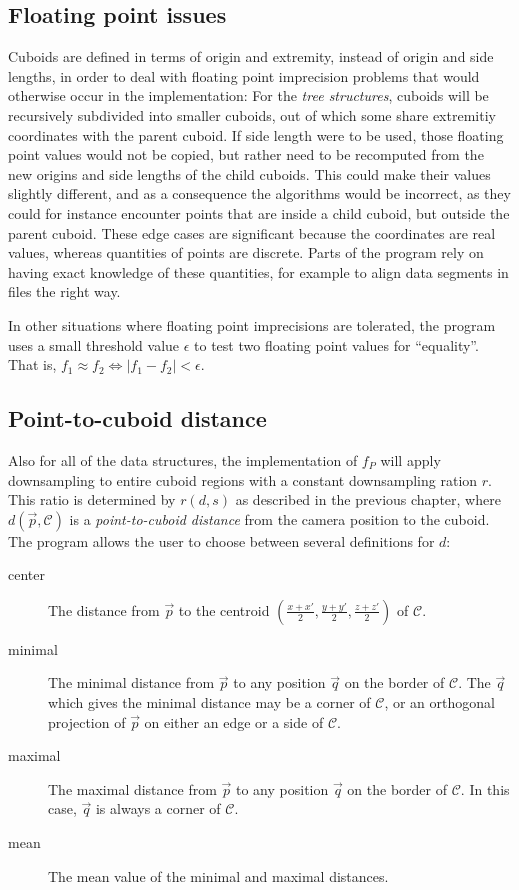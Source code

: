 \documentclass[a4paper,10pt,abstracton,notitlepage]{scrreprt}
\begin{document}
\subsection{Floating point issues}
Cuboids are defined in terms of origin and extremity, instead of origin and side lengths, in order to deal with floating point imprecision problems that would otherwise occur in the implementation: For the \emph{tree structures}, cuboids will be recursively subdivided into smaller cuboids, out of which some share extremitiy coordinates with the parent cuboid. If side length were to be used, those floating point values would not be copied, but rather need to be recomputed from the new origins and side lengths of the child cuboids. This could make their values slightly different, and as a consequence the algorithms would be incorrect, as they could for instance encounter points that are inside a child cuboid, but outside the parent cuboid.
These edge cases are significant because the coordinates are real values, whereas quantities of points are discrete. Parts of the program rely on having exact knowledge of these quantities, for example to align data segments in files the right way.

In other situations where floating point imprecisions are tolerated, the program uses a small threshold value $\epsilon$ to test two floating point values for ``equality''. That is, $f_{1} \approx f_{2} \Longleftrightarrow |f_{1} - f_{2}| < \epsilon$.

\subsection{Point-to-cuboid distance}
Also for all of the data structures, the implementation of $f_{P}$ will apply downsampling to entire cuboid regions with a constant downsampling ration $r$. This ratio is determined by $r(d, s)$ as described in the previous chapter, where $d(\overrightarrow{p}, \mathcal{C})$ is a \emph{point-to-cuboid distance} from the camera position to the cuboid. The program allows the user to choose between several definitions for $d$:
\begin{description}
\item[center] The distance from $\overrightarrow{p}$ to the centroid $( \frac{x + x'}{2}, \frac{y + y'}{2}, \frac{z + z'}{2} )$ of $\mathcal{C}$.
\item[minimal] The minimal distance from $\overrightarrow{p}$ to any position $\overrightarrow{q}$ on the border of $\mathcal{C}$. The $\overrightarrow{q}$ which gives the minimal distance may be a corner of $\mathcal{C}$, or an orthogonal projection of $\overrightarrow{p}$ on either an edge or a side of $\mathcal{C}$.
\item[maximal] The maximal distance from $\overrightarrow{p}$ to any position $\overrightarrow{q}$ on the border of $\mathcal{C}$. In this case, $\overrightarrow{q}$ is always a corner of $\mathcal{C}$.
\item[mean] The mean value of the minimal and maximal distances.
\end{description}
\end{document}
